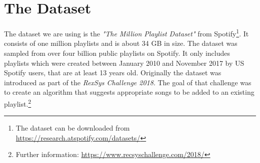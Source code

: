 \section{The Dataset}

The dataset we are using is the \textit{"The Million Playlist Dataset"} \citep{recsysChallenge} from Spotify\footnote{The dataset can be downloaded from \url{https://research.atspotify.com/datasets/}}. It consists of one million playlists and is about 34 GB in size. The dataset was sampled from over four billion public playlists on Spotify. It only includes playlists which were created between January 2010 and November 2017 by US Spotify users, that are at least 13 years old. Originally the dataset was introduced as part of the \textit{RexSys Challenge 2018}. The goal of that challenge was to create an algorithm that suggests appropriate songs to be added to an existing playlist.\footnote{Further information: \url{https://www.recsyschallenge.com/2018/}}




